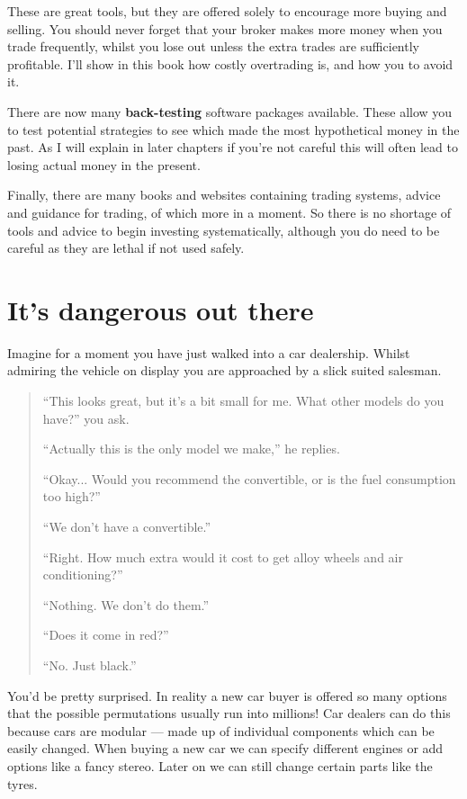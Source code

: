 These are great tools, but they are offered solely to encourage more buying and selling. You should never forget that your broker makes more money when you trade frequently, whilst you lose out unless the extra trades are sufficiently profitable. I'll show in this book how costly overtrading is, and how you to avoid it.

There are now many \textbf{back-testing} software packages available. These allow you to test potential strategies to see which made the most hypothetical money in the past. As I will explain in later chapters if you're not careful this will often lead to losing actual money in the present.

Finally, there are many books and websites containing trading systems, advice and guidance for trading, of which more in a moment. So there is no shortage of tools and advice to begin investing systematically, although you do need to be careful as they are lethal if not used safely.

\section*{It's dangerous out there}  {}

Imagine for a moment you have just walked into a car dealership. Whilst admiring the vehicle on display you are approached by a slick suited salesman.

\begin{quote}
``This looks great, but it's a bit small for me. What other models do you have?'' you ask. 

``Actually this is the only model we make,'' he replies. 

``Okay... Would you recommend the convertible, or is the fuel consumption too high?'' 

``We don't have a convertible.'' 

``Right. How much extra would it cost to get alloy wheels and air conditioning?'' 

``Nothing. We don't do them.'' 

``Does it come in red?'' 

``No. Just black.''
\end{quote}

You'd be pretty surprised. In reality a new car buyer is offered so many options that the possible permutations usually run into millions! Car dealers can do this because cars are modular --- made up of individual components which can be easily changed. When buying a new car we can specify different engines or add options like a fancy stereo. Later on we can still change certain parts like the tyres.

